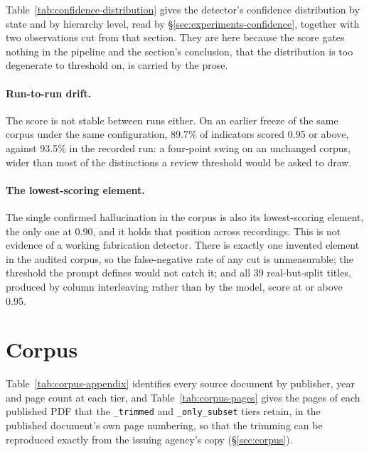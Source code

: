 \documentclass[11pt]{article}
\begin{document}
Table~\ref{tab:confidence-distribution} gives the detector's confidence
distribution by state and by hierarchy level, read by
\S\ref{sec:experiments-confidence}, together with two observations cut from
that section. They are here because the score gates nothing in the pipeline
and the section's conclusion, that the distribution is too degenerate to
threshold on, is carried by the prose.



\paragraph{Run-to-run drift.} The score is not stable between runs either. On
an earlier freeze of the same corpus under the same configuration, 89.7\% of
indicators scored 0.95 or above, against 93.5\% in the recorded run: a
four-point swing on an unchanged corpus, wider than most of the distinctions a
review threshold would be asked to draw.

\paragraph{The lowest-scoring element.} The single confirmed hallucination in
the corpus is also its lowest-scoring element, the only one at 0.90, and it
holds that position across recordings. This is not evidence of a working
fabrication detector. There is exactly one invented element in the audited
corpus, so the false-negative rate of any cut is unmeasurable; the threshold
the prompt defines would not catch it; and all 39 real-but-split titles,
produced by column interleaving rather than by the model, score at or above
0.95.

\section{Corpus}
\label{sec:appendix-corpus}

Table~\ref{tab:corpus-appendix} identifies every source document by publisher,
year and page count at each tier, and Table~\ref{tab:corpus-pages} gives the
pages of each published PDF that the \texttt{\_trimmed} and
\texttt{\_only\_subset} tiers retain, in the published document's own page
numbering, so that the trimming can be reproduced exactly from the issuing
agency's copy (\S\ref{sec:corpus}).





\end{document}
